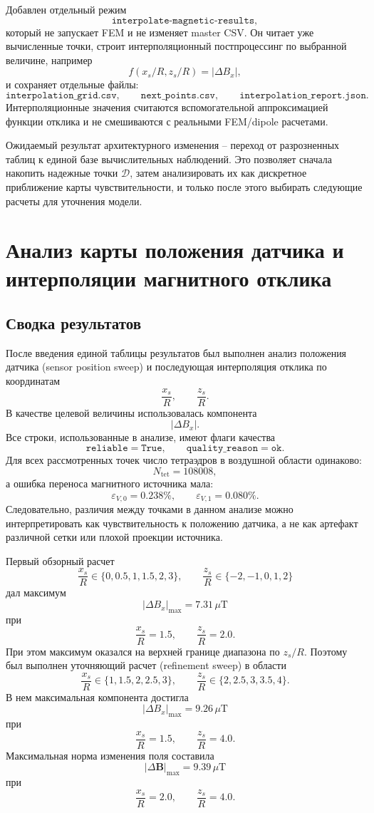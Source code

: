 \documentclass[12pt,a4paper]{article}
\begin{document}
Добавлен отдельный режим
\[
    \texttt{interpolate-magnetic-results},
\]
который не запускает FEM и не изменяет master CSV. Он читает уже вычисленные
точки, строит интерполяционный постпроцессинг по выбранной величине, например
\[
    f(x_s/R,z_s/R)=|\Delta B_x|,
\]
и сохраняет отдельные файлы:
\[
    \texttt{interpolation\_grid.csv},\qquad
    \texttt{next\_points.csv},\qquad
    \texttt{interpolation\_report.json}.
\]
Интерполяционные значения считаются вспомогательной аппроксимацией функции
отклика и не смешиваются с реальными FEM/dipole расчетами.

Ожидаемый результат архитектурного изменения -- переход от разрозненных
таблиц к единой базе вычислительных наблюдений. Это позволяет сначала
накопить надежные точки \(\mathcal D\), затем анализировать их как дискретное
приближение карты чувствительности, и только после этого выбирать следующие
расчеты для уточнения модели.

\section{Анализ карты положения датчика и интерполяции магнитного отклика}

\subsection*{Сводка результатов}

После введения единой таблицы результатов был выполнен анализ положения
датчика (sensor position sweep) и последующая интерполяция отклика по
координатам
\[
    \frac{x_s}{R},\qquad \frac{z_s}{R}.
\]
В качестве целевой величины использовалась компонента
\[
    |\Delta B_x|.
\]
Все строки, использованные в анализе, имеют флаги качества
\[
    \texttt{reliable}=\texttt{True},
    \qquad
    \texttt{quality\_reason}=\texttt{ok}.
\]
Для всех рассмотренных точек число тетраэдров в воздушной области одинаково:
\[
    N_{\mathrm{tet}}=108008,
\]
а ошибка переноса магнитного источника мала:
\[
    \varepsilon_{V,0}=0.238\%,
    \qquad
    \varepsilon_{V,1}=0.080\%.
\]
Следовательно, различия между точками в данном анализе можно интерпретировать
как чувствительность к положению датчика, а не как артефакт различной сетки или
плохой проекции источника.

Первый обзорный расчет
\[
    \frac{x_s}{R}\in\{0,0.5,1,1.5,2,3\},
    \qquad
    \frac{z_s}{R}\in\{-2,-1,0,1,2\}
\]
дал максимум
\[
    |\Delta B_x|_{\max}=7.31\,\mu\mathrm{T}
\]
при
\[
    \frac{x_s}{R}=1.5,\qquad \frac{z_s}{R}=2.0.
\]
При этом максимум оказался на верхней границе диапазона по \(z_s/R\). Поэтому
был выполнен уточняющий расчет (refinement sweep) в области
\[
    \frac{x_s}{R}\in\{1,1.5,2,2.5,3\},
    \qquad
    \frac{z_s}{R}\in\{2,2.5,3,3.5,4\}.
\]
В нем максимальная компонента достигла
\[
    |\Delta B_x|_{\max}=9.26\,\mu\mathrm{T}
\]
при
\[
    \frac{x_s}{R}=1.5,\qquad \frac{z_s}{R}=4.0.
\]
Максимальная норма изменения поля составила
\[
    |\Delta\mathbf B|_{\max}=9.39\,\mu\mathrm{T}
\]
при
\[
    \frac{x_s}{R}=2.0,\qquad \frac{z_s}{R}=4.0.
\]
\end{document}
